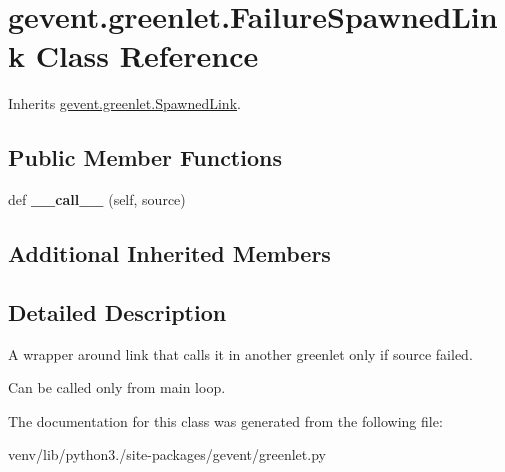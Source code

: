 \hypertarget{classgevent_1_1greenlet_1_1_failure_spawned_link}{}\section{gevent.\+greenlet.\+Failure\+Spawned\+Link Class Reference}
\label{classgevent_1_1greenlet_1_1_failure_spawned_link}


Inherits \hyperlink{classgevent_1_1greenlet_1_1_spawned_link}{gevent.\+greenlet.\+Spawned\+Link}.

\subsection*{Public Member Functions}
\begin{DoxyCompactItemize}
\item 
\mbox{\label{classgevent_1_1greenlet_1_1_failure_spawned_link_afb17e759ae0a7b4cfa7e36b440bb0267}} 
def {\bfseries \+\_\+\+\_\+call\+\_\+\+\_\+} (self, source)
\end{DoxyCompactItemize}
\subsection*{Additional Inherited Members}


\subsection{Detailed Description}
\begin{DoxyVerb}A wrapper around link that calls it in another greenlet only if source failed.

Can be called only from main loop.
\end{DoxyVerb}
 

The documentation for this class was generated from the following file\+:\begin{DoxyCompactItemize}
\item 
venv/lib/python3./site-\/packages/gevent/greenlet.\+py\end{DoxyCompactItemize}
